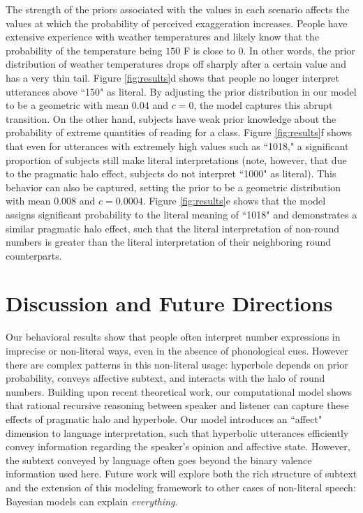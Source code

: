 \documentclass{article} %
\begin{document}
The strength of the priors associated with the values in each scenario affects the values at which the probability of perceived exaggeration increases. People have extensive experience with weather temperatures and likely know that the probability of the temperature being $150$ F is close to $0$. In other words, the prior distribution of weather temperatures drops off sharply after a certain value and has a very thin tail. Figure \ref{fig:results}d shows that people no longer interpret utterances above ``150" as literal. By adjusting the prior distribution in our model to be a geometric with mean $0.04$ and $c=0$, the model captures this abrupt transition.  On the other hand, subjects have weak prior knowledge about the probability of extreme quantities of reading for a class. Figure \ref{fig:results}f shows that even for utterances with extremely high values such as ``1018," a significant proportion of subjects still make literal interpretations (note, however, that due to the pragmatic halo effect, subjects do not interpret ``1000" as literal). This behavior can also be captured, setting the prior to be a geometric distribution with mean $0.008$ and $c=0.0004$. Figure \ref{fig:results}e shows that the model assigns significant probability to the literal meaning of ``1018" and demonstrates a similar pragmatic halo effect, such that the literal interpretation of non-round numbers is greater than the literal interpretation of their neighboring round counterparts.

\section{Discussion and Future Directions}

Our behavioral results show that people often interpret number expressions in imprecise or non-literal ways, even in the absence of phonological cues. However there are complex patterns in this non-literal usage: hyperbole depends on prior probability, conveys affective subtext, and interacts with the halo of round numbers.
Building upon recent theoretical work, our computational model shows that rational recursive reasoning between speaker and listener can capture these effects of pragmatic halo and hyperbole. Our model introduces an ``affect" dimension to language interpretation, such that hyperbolic utterances efficiently convey information regarding the speaker's opinion and affective state. However, the subtext conveyed by language often goes beyond the binary valence information used here. Future work will explore both the rich structure of subtext and the extension of this modeling framework to other cases of non-literal speech: Bayesian models can explain \emph{everything}.
\end{document}
